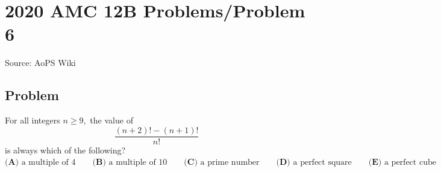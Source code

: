 \documentclass[12pt]{article}
\begin{document}
\section*{{2020 AMC 12B Problems/Problem 6}}
Source: AoPS Wiki

\subsection*{Problem}
For all integers $n \geq 9,$ the value of \[\frac{(n+2)!-(n+1)!}{n!}\] is always which of the following? $\textbf{(A) } \text{a multiple of 4} \qquad \textbf{(B) } \text{a multiple of 10} \qquad \textbf{(C) } \text{a prime number} \qquad \textbf{(D) } \text{a perfect square} \qquad \textbf{(E) } \text{a perfect cube}$
\end{document}
